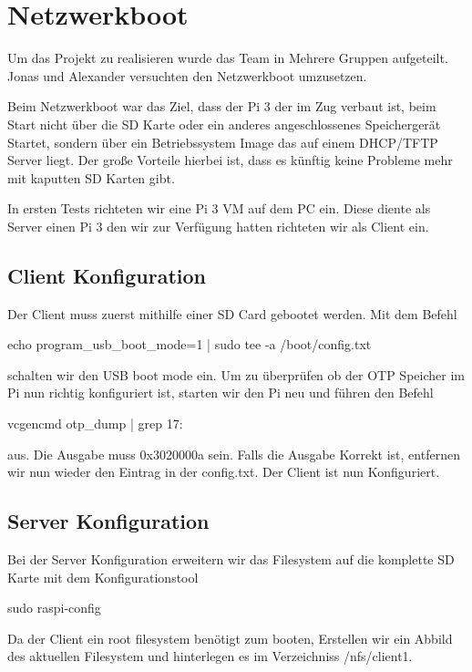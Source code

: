 \documentclass[a4paper,10pt] {article}
\begin{document}
	\section{Netzwerkboot}	
		
		Um das Projekt zu realisieren wurde das Team in Mehrere Gruppen aufgeteilt. Jonas und Alexander versuchten den Netzwerkboot umzusetzen.
		
		Beim Netzwerkboot war das Ziel, dass der Pi 3 der im Zug verbaut ist, beim Start nicht über die SD Karte oder ein anderes angeschlossenes Speichergerät Startet, sondern über ein Betriebssystem Image das auf einem DHCP/TFTP Server liegt.
		Der große Vorteile hierbei ist, dass es künftig keine Probleme mehr mit kaputten SD Karten gibt.
		
		In ersten Tests richteten wir eine Pi 3 VM auf dem PC ein. Diese diente als Server einen Pi 3 den wir zur Verfügung hatten richteten wir als Client ein. 
		
		\subsection{Client Konfiguration}
		
			Der Client muss zuerst mithilfe einer SD Card gebootet werden. Mit dem Befehl
			
				echo program\_usb\_boot\_mode=1 | sudo tee -a /boot/config.txt
			
			schalten wir den USB boot mode ein. Um zu überprüfen ob der OTP Speicher im Pi nun richtig konfiguriert ist, starten wir den Pi neu und führen den Befehl
			
				vcgencmd otp\_dump | grep 17:
			
			aus. Die Ausgabe muss 0x3020000a sein. Falls die Ausgabe Korrekt ist, entfernen wir nun wieder den Eintrag in der config.txt. Der Client ist nun Konfiguriert. 
			
		\vfill
		
		\subsection{Server Konfiguration}
		
			Bei der Server Konfiguration erweitern wir das Filesystem auf die komplette SD Karte mit dem Konfigurationstool 
			
			sudo raspi-config
			
			Da der Client ein root filesystem benötigt zum booten, Erstellen wir ein Abbild des aktuellen Filesystem und hinterlegen es im Verzeichniss /nfs/client1.
			 
\end{document}
